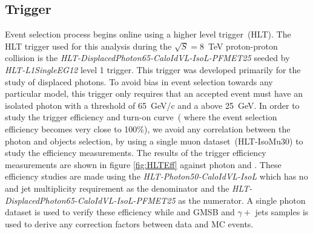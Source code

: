 \subsection{Trigger}
Event selection process begins online using a higher level trigger~(HLT). The HLT trigger used for this analysis during the $\sqrt{S} = 8$~TeV proton-proton collision is the \textit{HLT-DisplacedPhoton65-CaloIdVL-IsoL-PFMET25} seeded by \textit{HLT-L1SingleEG12} level 1 trigger. This trigger was developed primarily for the study of displaced photons. To avoid bias in event selection towards any particular model, this trigger only requires that an accepted event must have an isolated photon with a \pt threshold of 65~GeV/c and a \MET above 25~GeV. In order to study the trigger efficiency and turn-on curve~( where the event selection efficiency becomes very close to 100\%), we avoid  any correlation between the photon and \MET objects selection, by using a single muon dataset~(HLT-IsoMu30) to study the efficiency measurements.
The results of the trigger efficiency measurements are shown in figure \ref{fig:HLTEff} against photon \pt and \MET. These efficiency studies are made using the \textit{HLT-Photon50-CaloIdVL-IsoL} which has no \MET and jet multiplicity requirement  as the denominator and the  \textit{HLT-DisplacedPhoton65-CaloIdVL-IsoL-PFMET25} as the numerator. A single photon dataset is used to verify these efficiency while and GMSB and $\gamma +$ jets samples is used to derive any correction factors between data and MC events.

